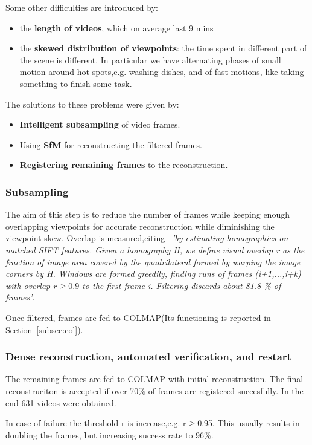 Some other difficulties are introduced by:
\begin{itemize}
    \item the \textbf{length of videos}, which on average last 9 mins
    \item the \textbf{skewed distribution of viewpoints}: the time spent in different part of the scene is different. In particular we have alternating phases of small motion
    around hot-spots,e.g. washing dishes, and of fast motions, like taking something to finish some task.
\end{itemize} 
The solutions to these problems were given by:
\begin{itemize}
    \item\textbf{ Intelligent subsampling} of video frames.
    \item Using \textbf{SfM} for reconstructing the filtered frames.
    \item \textbf{Registering remaining frames} to the reconstruction.
\end{itemize}

\subsubsection{Subsampling}
The aim of this step is to reduce the number of frames while keeping enough overlapping viewpoints for accurate reconstruction while diminishing the viewpoint skew.
Overlap is measured,citing~\cite{epic_fields} \textit{'by estimating homographies  on matched SIFT features. Given a homography H, we define visual overlap r as the fraction of image 
area covered by the quadrilateral formed by warping the image corners by H. Windows are formed greedily, finding runs of frames 
(i+1,...,i+k) with overlap $r\geq0.9$ to the first frame i. Filtering discards about 81.8 \% of frames'}.

Once filtered, frames are fed to COLMAP(Its functioning is reported in Section~\ref{subsec:col}).

\subsubsection{Dense reconstruction, automated verification, and restart}
The remaining frames are fed to COLMAP with initial reconstruction. The final reconstruciton is accepted if over 70\% of frames are registered succesfully.
In the end 631 videos were obtained.

In case of failure the threshold r is increase,e.g. r$\geq$0.95. This usually results in doubling the frames, but increasing success rate to 96\%.


